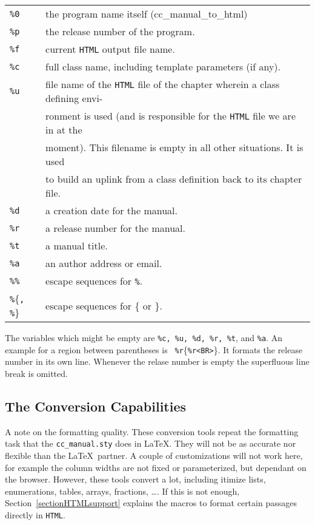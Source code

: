 \documentclass[12pt]{article}
\begin{document}
\begin{tabular}{ll}
    {\tt\%0}  &  the program name itself (cc\_manual\_to\_html) \\
    {\tt\%p}  &  the release number of the program. \\
    {\tt\%f}  &  current {\tt HTML} output file name. \\
    {\tt\%c}  &  full class name, including template parameters (if any). \\
    {\tt\%u}  &  file name of the {\tt HTML} file of the chapter wherein a
    class defining envi- \\ & ronment is used (and is responsible for the
    {\tt HTML} file we are in at the\\ &  moment). This filename is empty
    in all other situations. It is used \\ & to build an uplink from a
    class definition back to its chapter file. \\
    {\tt\%d}  &  a creation date for the manual.\\
    {\tt\%r}  &  a release number for the manual.\\
    {\tt\%t}  &  a manual title. \\
    {\tt\%a}  &  an author address or email.\\
    {\tt\%\%}  &  escape sequences for {\tt\%}.\\
    {\tt\%}\{{\tt , \%}\}  &  escape sequences for \{ or \}.
\end{tabular}

The variables which might be empty are {\tt\%c, \%u, \%d, \%r, \%t},
and {\tt\%a}.  An example for a region between parentheses is {\tt
  \%r}\{{\tt \%r<BR>}\}. It formats the release number in its own line.
Whenever the relase number is empty the superfluous line break
is omitted.

\subsection{The Conversion Capabilities}

A note on the formatting quality. These conversion tools repeat the
formatting task that the {\tt cc\_manual.sty} does in \LaTeX. They
will not be as accurate nor flexible than the \LaTeX\ partner. A
couple of customizations will not work here, for example the column
widths are not fixed or parameterized, but dependant on the browser.
However, these tools convert a lot, including itimize lists,
enumerations, tables, arrays, fractions, \ldots.  If this is not
enough, Section~\ref{sectionHTMLsupport} explains the macros to format
certain passages directly in {\tt HTML}.
\end{document}
